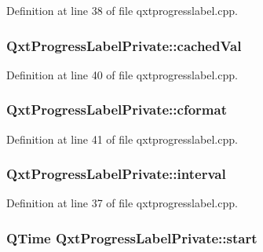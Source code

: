 Definition at line 38 of file qxtprogresslabel.\-cpp.

\hypertarget{class_qxt_progress_label_private_a1bb19ab9ff0387503c9b14cfbc134953}{
\subsubsection[{cached\-Val}]{ Qxt\-Progress\-Label\-Private\-::cached\-Val}}\label{class_qxt_progress_label_private_a1bb19ab9ff0387503c9b14cfbc134953}


Definition at line 40 of file qxtprogresslabel.\-cpp.

\hypertarget{class_qxt_progress_label_private_a8eac5788df3296785955b8c1527e747e}{
\subsubsection[{cformat}]{ Qxt\-Progress\-Label\-Private\-::cformat}}\label{class_qxt_progress_label_private_a8eac5788df3296785955b8c1527e747e}


Definition at line 41 of file qxtprogresslabel.\-cpp.

\hypertarget{class_qxt_progress_label_private_aa7ab0a6fec4fd9e5957d23f1450fab3c}{
\subsubsection[{interval}]{ Qxt\-Progress\-Label\-Private\-::interval}}\label{class_qxt_progress_label_private_aa7ab0a6fec4fd9e5957d23f1450fab3c}


Definition at line 37 of file qxtprogresslabel.\-cpp.

\hypertarget{class_qxt_progress_label_private_a8e39982e3e0637c9d013db0dfb357689}{
\subsubsection[{start}]{\setlength{\rightskip}{0pt plus 5cm}Q\-Time Qxt\-Progress\-Label\-Private\-::start}}\label{class_qxt_progress_label_private_a8e39982e3e0637c9d013db0dfb357689}


